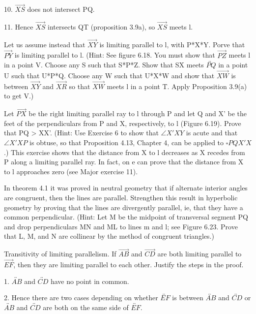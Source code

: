 \documentclass[12pt,letterpaper]{article}
\newcommand{\prob}[1]{\newpage\noindent {\bf #1}}
\begin{document}
10. $\overrightarrow{XS}$ does not intersect PQ.  

11. Hence $\overrightarrow{XS}$ intersects QT (proposition 3.9a), so $\overrightarrow{XS}$ meets l. 




\prob{7 } Let us assume instead that $\overrightarrow{XY}$ is limiting parallel to l, with P*X*Y.  Porve that $\overrightarrow{PY}$ is limiting parallel to l.  (Hint: See figure 6.18.  You must show that $\overrightarrow{PZ}$ meets l in a point V.  Choose any S such that S*P*Z.  Show that SX meets $\overleftrightarrow{PQ}$ in a point U such that U*P*Q.  Choose any W such that U*X*W and show that $\overrightarrow{XW}$ is between $\overrightarrow{XY}$ and $\overrightarrow{XR}$ so that $\overrightarrow{XW}$ meets l in a point T.  Apply Proposition 3.9(a) to get V.)


\prob{8 } Let $\overrightarrow{PX}$ be the right limiting parallel ray to l through P and let Q and X' be the feet of the perpendiculars from P and X, respectively, to l (Figure 6.19).  Prove that PQ > XX'. (Hint: Use Exercise 6 to show that $\angle X'XY$ is acute and that $\angle X'XP$ is obtuse, so that Proposition 4.13, Chapter 4, can be applied to $\square PQX'X$.) This exercise shows that the distance from X to l decreases as X recedes from P along a limiting parallel ray.  In fact, on e can prove that the distance from X to l approaches zero (see Major exercise 11).



\prob{12 } In theorem 4.1 it was proved in neutral geometry that if alternate interior angles are congruent, then the lines are parallel.  Strengthen this result in hyperbolic geometry by proving that the lines are divergently parallel, ie, that they have a common perpendicular.  (Hint: Let M be the midpoint of transversal segment PQ and drop perpendiculars MN and ML to lines m and l;  see Figure 6.23.  Prove that L, M, and N are collinear by the method of congruent triangles.)



\prob{Major Exercises 3 }

Transitivity of limiting parallelism.  If $\overrightarrow{AB}$ and $\overrightarrow{CD}$ are both limiting parallel to $\overrightarrow{EF}$, then they are limiting parallel to each other. Justify the steps in the proof.  

1. $\overleftrightarrow{AB}$ and $\overleftrightarrow{CD}$ have no point in common.

2. Hence there are two cases depending on whether $\overleftrightarrow{EF}$ is between $\overleftrightarrow{AB}$ and $\overleftrightarrow{CD}$ or $\overleftrightarrow{AB}$ and $\overleftrightarrow{CD}$ are both on the same side of $\overleftrightarrow{EF}$.
\end{document}
